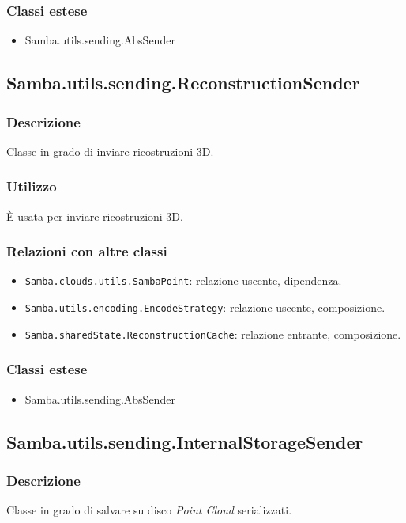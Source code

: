 \subsubsection{Classi estese}
\begin{itemize}
	\item Samba.utils.sending.AbsSender
\end{itemize}

\subsection{Samba.utils.sending.ReconstructionSender}
\subsubsection{Descrizione}
Classe in grado di inviare ricostruzioni 3D.
\subsubsection{Utilizzo}
È usata per inviare ricostruzioni 3D.
\subsubsection{Relazioni con altre classi}
\begin{itemize}
	\item \texttt{Samba.clouds.utils.SambaPoint}: relazione uscente, dipendenza.
	\item \texttt{Samba.utils.encoding.EncodeStrategy}: relazione uscente, composizione.
	\item \texttt{Samba.sharedState.ReconstructionCache}: relazione entrante, composizione.
\end{itemize}
\subsubsection{Classi estese}
\begin{itemize}
	\item Samba.utils.sending.AbsSender
\end{itemize}

\subsection{Samba.utils.sending.InternalStorageSender}
\subsubsection{Descrizione}
Classe in grado di salvare su disco \emph{Point Cloud} serializzati.
